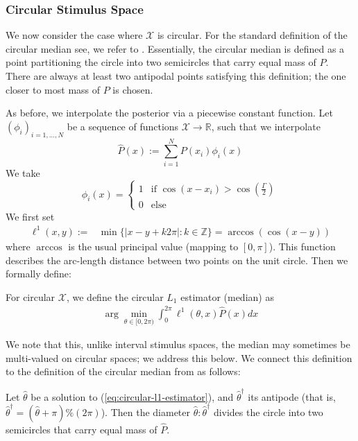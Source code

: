 \subsubsection*{Circular Stimulus Space}



We now consider the case where $\mathcal{X}$ is circular.
For the standard definition of the circular median see, we refer to \citet{otieno2003more}. 
Essentially, the circular median is defined as a point partitioning the circle into two semicircles that carry equal mass of $P$. There are always at least two antipodal points satisfying this definition; the one closer to most mass of $P$ is chosen.


As before, we interpolate the posterior via a piecewise constant function.
Let $(\phi_i)_{i=1, \dots, N}$ be a sequence of functions $\mathcal{X} \rightarrow \mathbb{R}$, such that we interpolate
\begin{equation}
    \widehat{P}(x) := \sum_{i=1}^N P(x_i) \phi_i(x)
\end{equation}
We take
\begin{equation}
    \phi_i(x) = \begin{cases}
        1 & \text{if } \cos(x-x_i) > \cos(\frac{\Gamma}{2}) \\
        0 & \text{else}
    \end{cases}
\end{equation}
We first set
\begin{align*}
    \ell^1(x,y) := & \min \{|x-y+k2\pi| : k \in \mathbb{Z}\} = \arccos(\cos(x-y))
\end{align*}
where $\arccos$ is the usual principal value (mapping to $[0,\pi]$). 
This function describes the arc-length distance between two points on the unit circle.
Then we formally define:
\begin{defin}
For circular $\mathcal{X}$, we define the circular $L_1$ estimator (median) as
\begin{align}\label{eq:circular-l1-estimator}
     \arg\min_{\theta \in [0,2\pi)} \int_0^{2\pi} \ell^1(\theta,x) \widehat{P}(x) dx 
\end{align}
\end{defin}
We note that this, unlike interval stimulus spaces, the median may sometimes be multi-valued on circular spaces; we address this below.
We connect this definition to the definition of the circular median from \citet{otieno2003more} as follows: 
\begin{lemma}
Let $\widehat{\theta}$ be a solution to (\ref{eq:circular-l1-estimator}), and $\widehat{\theta}^\dagger$ its antipode (that is, $\widehat{\theta}^\dagger = (\widehat{\theta} + \pi) \% (2\pi)$).
Then the diameter $\widehat{\theta} : \widehat{\theta}^\dagger$  divides the circle into two semicircles that carry equal mass of $\widehat{P}$.
\end{lemma}
